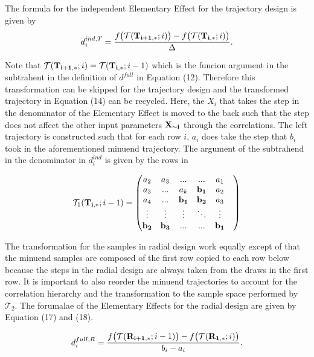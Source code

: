 \documentclass[a4paper,12pt]{article}
\begin{document}
\noindent
The formula for the independent Elementary Effect for the trajectory design is given by
\begin{align}
d_i^{ind, T} = \frac{f\big(\mathcal{T}(\bold{T_{i+1,*}}; i)\big) - f\big(\mathcal{T}(\bold{T_{i,*}}; i)\big)}{\Delta}.
\end{align}

Note that $\mathcal{T}(\bold{T_{i+1,*}}; i) = \mathcal{T}(\bold{T_{i,*}}; i-1)$ which is the funcion argument in the subtrahent in the definition of $d^{full}$ in Equation (12). Therefore this transformation can be skipped for the trajectory design and the transformed trajectory in Equation (14) can be recycled. Here, the $X_i$ that takes the step in the denominator of the Elementary Effect is moved to the back such that the step does not affect the other input parameters $\bold{X_{\sim i}}$ through the correlations. The left trajectory is constructed such that for each row $i$, $a_i$ does take the step that $b_i$ took in the aforementioned minuend trajectory. The argument of the subtrahend in the denominator in $d_i^{ind}$ is given by the rows in

\begin{align}
\mathcal{T}_1(\bold{T_{i,*}}; i-1)=
\begin{pmatrix}
a_2 & a_3 & ... & ... &  a_1 \\
a_3 & ... & a_k &  \bold{b_1} & a_2 \\
a_4 & ... & \bold{b_1} &  \bold{b_2} & a_3 & \\
\vdots & \vdots & \vdots & 	\ddots &  \vdots\\
\bold{b_2} & \bold{b_{3}} & ... & ... &  \bold{b_{1}}
\end{pmatrix}
\end{align}

\noindent
The transformation for the samples in radial design work equally except of that the minuend samples are composed of the first row copied to each row below because the steps in the radial design are always taken from the draws in the first row. It is important to also reorder the minuend trajectories to account for the correlation hierarchy and the transformation to the sample space performed by $\mathcal{T}_2$. The forumalae of the Elementary Effects for the radial design are given by Equation (17) and (18).

\begin{align}
d_i^{full, R} = \frac{f\big(\mathcal{T}(\bold{R_{i+1,*}}; i-1)\big) - f\big(\mathcal{T}(\bold{R_{1,*}}; i)\big)}{b_i - a_i}.
\end{align}
\end{document}
